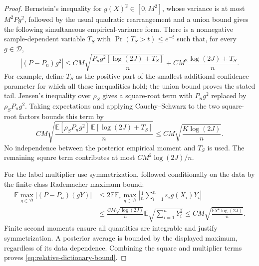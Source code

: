 \begin{proof}
Bernstein's inequality for $g(X)^2\in[0,M^2]$, whose variance is at most $M^2Pg^2$, followed by the usual quadratic rearrangement and a union bound gives the following simultaneous empirical-variance form. There is a nonnegative sample-dependent variable $T_S$ with $\Pr(T_S>t)\le e^{-t}$ such that, for every $g\in\mathcal D$,
\[
 |(P-P_n)g^2|
 \le C M\sqrt{\frac{P_ng^2[\log(2J)+T_S]}n}
       +C M^2\frac{\log(2J)+T_S}n.
\]
For example, define $T_S$ as the positive part of the smallest additional confidence parameter for which all these inequalities hold; the union bound proves the stated tail. Jensen's inequality over $\rho_S$ gives a square-root term with $P_ng^2$ replaced by $\rho_SP_ng^2$. Taking expectations and applying Cauchy--Schwarz to the two square-root factors bounds this term by
\[
 C M\sqrt{\frac{\mathbb E[\rho_SP_ng^2]\,
              \mathbb E[\log(2J)+T_S]}n}
 \le C M\sqrt{\frac{K\log(2J)}n}.
\]
No independence between the posterior empirical moment and $T_S$ is used. The remaining square term contributes at most $CM^2\log(2J)/n$.

For the label multiplier use symmetrization, followed conditionally on the data by the finite-class Rademacher maximum bound:
\begin{align*}
 \mathbb E\max_{g\in\mathcal D}|(P-P_n)(gY)|
 &\le 2\mathbb E\mathbb E_\varepsilon
          \max_{g\in\mathcal D}
            \left|\frac1n\sum_{i=1}^n\varepsilon_i g(X_i)Y_i\right|\\
 &\le \frac{C M\sqrt{\log(2J)}}n
            \mathbb E\sqrt{\sum_{i=1}^nY_i^2}
 \le C M\sqrt{\frac{\mathbb E Y^2\log(2J)}n}.
\end{align*}
Finite second moments ensure all quantities are integrable and justify symmetrization. A posterior average is bounded by the displayed maximum, regardless of its data dependence. Combining the square and multiplier terms proves \eqref{eq:relative-dictionary-bound}.
\end{proof}

